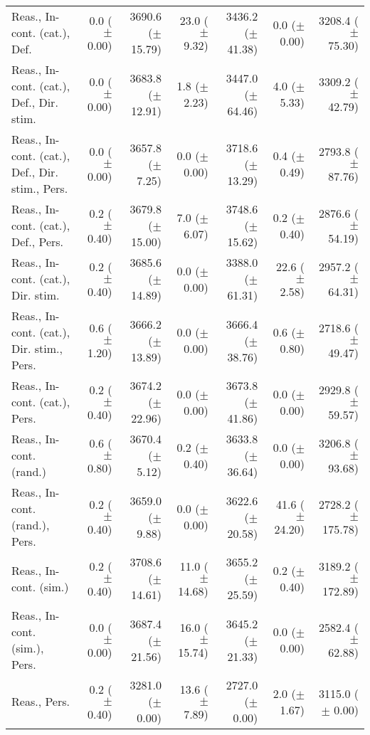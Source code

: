 \begin{table*}
\begin{tabular}{lrrrrrr}
        Reas., In-cont. (cat.), Def. & 0.0 ($\pm$ 0.00) & 3690.6 ($\pm$ 15.79) & 23.0 ($\pm$ 9.32) & 3436.2 ($\pm$ 41.38) & 0.0 ($\pm$ 0.00) & 3208.4 ($\pm$ 75.30) \\
        Reas., In-cont. (cat.), Def., Dir. stim. & 0.0 ($\pm$ 0.00) & 3683.8 ($\pm$ 12.91) & 1.8 ($\pm$ 2.23) & 3447.0 ($\pm$ 64.46) & 4.0 ($\pm$ 5.33) & 3309.2 ($\pm$ 42.79) \\
        Reas., In-cont. (cat.), Def., Dir. stim., Pers. & 0.0 ($\pm$ 0.00) & 3657.8 ($\pm$ 7.25) & 0.0 ($\pm$ 0.00) & 3718.6 ($\pm$ 13.29) & 0.4 ($\pm$ 0.49) & 2793.8 ($\pm$ 87.76) \\
        Reas., In-cont. (cat.), Def., Pers. & 0.2 ($\pm$ 0.40) & 3679.8 ($\pm$ 15.00) & 7.0 ($\pm$ 6.07) & 3748.6 ($\pm$ 15.62) & 0.2 ($\pm$ 0.40) & 2876.6 ($\pm$ 54.19) \\
        Reas., In-cont. (cat.), Dir. stim. & 0.2 ($\pm$ 0.40) & 3685.6 ($\pm$ 14.89) & 0.0 ($\pm$ 0.00) & 3388.0 ($\pm$ 61.31) & 22.6 ($\pm$ 2.58) & 2957.2 ($\pm$ 64.31) \\
        Reas., In-cont. (cat.), Dir. stim., Pers. & 0.6 ($\pm$ 1.20) & 3666.2 ($\pm$ 13.89) & 0.0 ($\pm$ 0.00) & 3666.4 ($\pm$ 38.76) & 0.6 ($\pm$ 0.80) & 2718.6 ($\pm$ 49.47) \\
        Reas., In-cont. (cat.), Pers. & 0.2 ($\pm$ 0.40) & 3674.2 ($\pm$ 22.96) & 0.0 ($\pm$ 0.00) & 3673.8 ($\pm$ 41.86) & 0.0 ($\pm$ 0.00) & 2929.8 ($\pm$ 59.57) \\
        Reas., In-cont. (rand.) & 0.6 ($\pm$ 0.80) & 3670.4 ($\pm$ 5.12) & 0.2 ($\pm$ 0.40) & 3633.8 ($\pm$ 36.64) & 0.0 ($\pm$ 0.00) & 3206.8 ($\pm$ 93.68) \\
        Reas., In-cont. (rand.), Pers. & 0.2 ($\pm$ 0.40) & 3659.0 ($\pm$ 9.88) & 0.0 ($\pm$ 0.00) & 3622.6 ($\pm$ 20.58) & 41.6 ($\pm$ 24.20) & 2728.2 ($\pm$ 175.78) \\
        Reas., In-cont. (sim.) & 0.2 ($\pm$ 0.40) & 3708.6 ($\pm$ 14.61) & 11.0 ($\pm$ 14.68) & 3655.2 ($\pm$ 25.59) & 0.2 ($\pm$ 0.40) & 3189.2 ($\pm$ 172.89) \\
        Reas., In-cont. (sim.), Pers. & 0.0 ($\pm$ 0.00) & 3687.4 ($\pm$ 21.56) & 16.0 ($\pm$ 15.74) & 3645.2 ($\pm$ 21.33) & 0.0 ($\pm$ 0.00) & 2582.4 ($\pm$ 62.88) \\
        Reas., Pers. & 0.2 ($\pm$ 0.40) & 3281.0 ($\pm$ 0.00) & 13.6 ($\pm$ 7.89) & 2727.0 ($\pm$ 0.00) & 2.0 ($\pm$ 1.67) & 3115.0 ($\pm$ 0.00) \\

        \bottomrule
    \end{tabular}


\end{table*}
